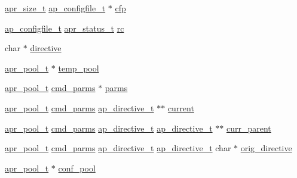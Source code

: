 \begin{DoxyCompactItemize}
\item 
\hyperlink{group__apr__platform_gaaa72b2253f6f3032cefea5712a27540e}{apr\+\_\+size\+\_\+t} \hyperlink{structap__configfile__t}{ap\+\_\+configfile\+\_\+t} $\ast$ \hyperlink{group__APACHE__CORE__CONFIG_ga6733f6056ae3ee36cae088acfc415bcc}{cfp}
\item 
\hyperlink{structap__configfile__t}{ap\+\_\+configfile\+\_\+t} \hyperlink{group__apr__errno_gaa5105fa83cc322f09382292db8b47593}{apr\+\_\+status\+\_\+t} \hyperlink{group__APACHE__CORE__CONFIG_ga2e051c0ce9ee165170cd7973f2464512}{rc}
\item 
char $\ast$ \hyperlink{group__APACHE__CORE__CONFIG_ga1b89c6a3ccbc534f73a9bc9606423682}{directive}
\item 
\hyperlink{structapr__pool__t}{apr\+\_\+pool\+\_\+t} $\ast$ \hyperlink{group__APACHE__CORE__CONFIG_ga08fccb92bd49ffdef830665b85f0c614}{temp\+\_\+pool}
\item 
\hyperlink{structapr__pool__t}{apr\+\_\+pool\+\_\+t} \hyperlink{group__APACHE__CORE__CONFIG_ga1791fbd28d06a9847bad001541c5241e}{cmd\+\_\+parms} $\ast$ \hyperlink{group__APACHE__CORE__CONFIG_ga3e664e44484c440b3d2347dcf848ab85}{parms}
\item 
\hyperlink{structapr__pool__t}{apr\+\_\+pool\+\_\+t} \hyperlink{group__APACHE__CORE__CONFIG_ga1791fbd28d06a9847bad001541c5241e}{cmd\+\_\+parms} \hyperlink{structap__directive__t}{ap\+\_\+directive\+\_\+t} $\ast$$\ast$ \hyperlink{group__APACHE__CORE__CONFIG_ga4b3e87cb39cac2296c5083f27321f1f4}{current}
\item 
\hyperlink{structapr__pool__t}{apr\+\_\+pool\+\_\+t} \hyperlink{group__APACHE__CORE__CONFIG_ga1791fbd28d06a9847bad001541c5241e}{cmd\+\_\+parms} \hyperlink{structap__directive__t}{ap\+\_\+directive\+\_\+t} \hyperlink{structap__directive__t}{ap\+\_\+directive\+\_\+t} $\ast$$\ast$ \hyperlink{group__APACHE__CORE__CONFIG_ga0fda942ffe70ed3752b85c84a9214c2c}{curr\+\_\+parent}
\item 
\hyperlink{structapr__pool__t}{apr\+\_\+pool\+\_\+t} \hyperlink{group__APACHE__CORE__CONFIG_ga1791fbd28d06a9847bad001541c5241e}{cmd\+\_\+parms} \hyperlink{structap__directive__t}{ap\+\_\+directive\+\_\+t} \hyperlink{structap__directive__t}{ap\+\_\+directive\+\_\+t} char $\ast$ \hyperlink{group__APACHE__CORE__CONFIG_gae4c34983fb2a6fbe364b62854dce0bba}{orig\+\_\+directive}
\item 
\hyperlink{structapr__pool__t}{apr\+\_\+pool\+\_\+t} $\ast$ \hyperlink{group__APACHE__CORE__CONFIG_gaec639b1fb5a5702becc4208ed53096b0}{conf\+\_\+pool}
\item 

\end{DoxyCompactItemize}
